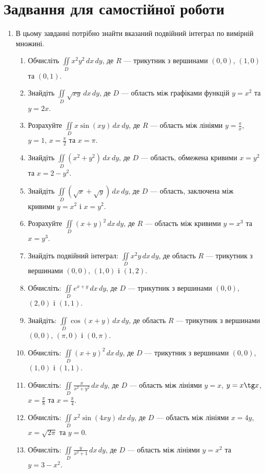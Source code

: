 \chapter{Задвання для самостійної роботи}
\begin{enumerate}
\item  В цьому завданні потрібно знайти вказаний подвійний інтеграл по вимірній множині.
\begin{enumerate}[label*=\arabic*.]
\item Обчисліть ${{\iint\limits_D x^2y^2 \,dx\,dy}}$, де ${{R}}$ --- трикутник з вершинами ${(0,0)}$, ${(1,0)}$ та ${(0,1)}$.
\item Знайдіть ${\iint\limits_D \sqrt{xy} \,dx\,dy}$, де ${D}$ --- область між графіками функцій ${y = x^2}$ та ${y = 2x}$.
\item Розрахуйте ${\iint\limits_D x\sin(xy) \,dx\,dy}$, де ${R}$ --- область між лініями ${y = \frac{\pi}{x}}$, ${y = 1}$, ${x = \frac{\pi}{2}}$ та ${x = \pi}$.
\item Знайдіть ${\iint\limits_D (x^2 + y^2) \,dx\,dy}$, де ${D}$ --- область, обмежена кривими ${x = y^2}$ та ${x = 2-y^2}$.
\item Знайдіть ${\iint\limits_D \left(\sqrt{x} + \sqrt{y}\right) \,dx\,dy}$, де ${D}$ --- область, заключена між кривими ${y = x^2}$ і ${x = y^2}$.
\item Розрахуйте ${\iint\limits_D  (x +y)^{2} \,dx\,dy}$, де ${R}$ --- область між кривими ${y = x^3}$ та ${x = y^3}$.
  \item Знайдіть подвійний інтеграл: $\iint\limits_D x^2y\,dx\,dy$, де область $R$ --- трикутник з вершинами $(0,0)$, $(1,0)$ і $(1,2)$.
  \item Обчисліть: $\iint\limits_D e^{x+y}\,dx\,dy$, де $D$ --- трикутник з вершинами $(0,0)$, $(2,0)$ і $(1,1)$.
  \item Знайдіть: $\iint\limits_D \cos(x+y)\,dx\,dy$, де область $R$ --- трикутник з вершинами $(0,0)$, $(\pi,0)$ і $(0,\pi)$.
  \item Обчисліть: $\iint\limits_D (x+y)^2\,dx\,dy$, де $D$ --- трикутник з вершинами $(0,0)$, $(1,0)$ і $(1,1)$.
  \item Обчисліть: $\iint\limits_D \frac{x}{x^2+y^2}\,dx\,dy$, де $D$ --- область між лініями ${y = x}$, ${y = x\tg x}$, ${x = \frac{\pi}{8}}$ та ${x = \frac{\pi}{4}}$.
  \item Обчисліть: $\iint\limits_D x^2\sin(4 x y)\,dx\,dy$, де $D$ --- область між лініями ${x = 4y}$, ${x = \sqrt{2\pi}}$ та ${y = 0}$.
  \item Обчисліть: $\iint\limits_D \frac{y}{x^2 + 1}\,dx\,dy$, де $D$ --- область між лініями ${y = x^2}$ та ${y = 3 - x^2}$.

\end{enumerate}
\end{enumerate}
